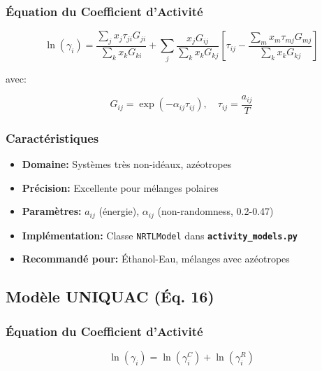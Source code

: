 \documentclass[11pt,a4paper]{article}
\newcommand{\code}[1]{\texttt{#1}}
\newcommand{\file}[1]{\texttt{\textbf{#1}}}
\begin{document}
\subsubsection{Équation du Coefficient d'Activité}

\begin{tcolorbox}[colback=yellow!10,colframe=orange!50!black,title=Équation 15: Modèle NRTL]
\begin{equation}
\ln(\gamma_i) = \frac{\sum_j x_j \tau_{ji} G_{ji}}{\sum_k x_k G_{ki}} + \sum_j \frac{x_j G_{ij}}{\sum_k x_k G_{kj}} \left[\tau_{ij} - \frac{\sum_m x_m \tau_{mj} G_{mj}}{\sum_k x_k G_{kj}}\right]
\end{equation}
\end{tcolorbox}

avec:

\begin{equation}
G_{ij} = \exp(-\alpha_{ij} \tau_{ij}), \quad \tau_{ij} = \frac{a_{ij}}{T}
\end{equation}

\subsubsection{Caractéristiques}

\begin{itemize}[leftmargin=*]
    \item \textbf{Domaine:} Systèmes très non-idéaux, azéotropes
    \item \textbf{Précision:} Excellente pour mélanges polaires
    \item \textbf{Paramètres:} $a_{ij}$ (énergie), $\alpha_{ij}$ (non-randomness, 0.2-0.47)
    \item \textbf{Implémentation:} Classe \code{NRTLModel} dans \file{activity\_models.py}
    \item \textbf{Recommandé pour:} Éthanol-Eau, mélanges avec azéotropes
\end{itemize}

\subsection{Modèle UNIQUAC (Éq. 16)}

\subsubsection{Équation du Coefficient d'Activité}

\begin{tcolorbox}[colback=yellow!10,colframe=orange!50!black,title=Équation 16: Modèle UNIQUAC]
\begin{equation}
\ln(\gamma_i) = \ln(\gamma_i^C) + \ln(\gamma_i^R)
\end{equation}
\end{tcolorbox}
\end{document}
